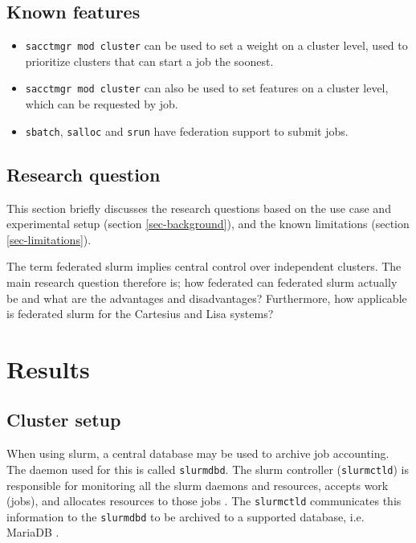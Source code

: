 \documentclass[conference]{IEEEtran}
\begin{document}
\subsection{Known features}
\begin{itemize}
    \item \texttt{sacctmgr mod cluster} can be used to set a weight on a cluster level, used to prioritize clusters that can start a job the soonest.
    \item \texttt{sacctmgr mod cluster} can also be used to set features on a cluster level, which can be requested by job.
    \item \texttt{sbatch}, \texttt{salloc} and \texttt{srun} have federation support to submit jobs.
\end{itemize}

\subsection{Research question}
This section briefly discusses the research questions based on the use case and experimental setup (section \ref{sec-background}), and the known limitations (section \ref{sec-limitations}).

The term federated \gls{slurm} implies central control over independent clusters. The main research question therefore is; how federated can federated \gls{slurm} actually be and what are the advantages and disadvantages? Furthermore, how applicable is federated \gls{slurm} for the Cartesius and Lisa systems?


\section{Results}
\subsection{Cluster setup}
\label{sec-cluster-setup}
When using \gls{slurm}, a central database may be used to archive job accounting. The daemon used for this is called \texttt{slurmdbd}. The \gls{slurm} controller (\texttt{slurmctld}) is responsible for monitoring all the \gls{slurm} daemons and resources, accepts work (jobs), and allocates resources to those jobs \cite{slurm-slurmctld}. The \texttt{slurmctld} communicates this information to the \texttt{slurmdbd} to be archived to a supported database, i.e. MariaDB \cite{mariadb}.
\end{document}
